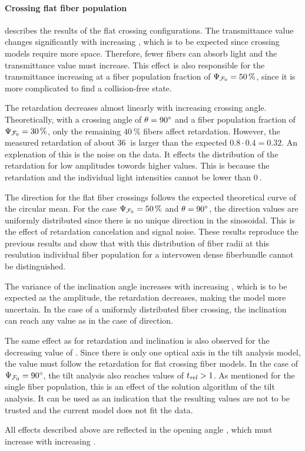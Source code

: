 \paragraph{Crossing flat fiber population}
 describes the results of the flat crossing configurations.
The transmittance value changes significantly with increasing \modelOmega{}, which is to be expected since crossing models require more space.
Therefore, fewer fibers can absorb light and the transmittance value must increase.
This effect is also responsible for the transmittance increasing at a fiber population fraction of $\textnormal{$\Psi_{\textnormal{$\mathcal{F}_0$}}$}=\SI{50}{\percent}$, since it is more complicated to find a collision-free state.
\par
%
The retardation decreases almost linearly with increasing crossing angle.
Theoretically, with a crossing angle of $\textnormal{$\theta$}=\SI{90}{\degree}$ and a fiber population fraction of $\textnormal{$\Psi_{\textnormal{$\mathcal{F}_0$}}$}=\SI{30}{\percent}$, only the remaining $\SI{40}{\percent}$ fibers affect retardation.
However, the measured retardation of about $\SI{36}{}$ is larger than the expected $0.8\cdot 0.4 = 0.32$.
An explenation of this is the noise on the data.
It effects the distribution of the retardation for low amplitudes towords higher values.
This is because the retardation and the individual light intensities cannot be lower than $\SI{0}{}$.
\par
%
The direction for the flat fiber crossings follows the expected theoretical curve of the circular mean.
For the case $\textnormal{$\Psi_{\textnormal{$\mathcal{F}_0$}}$}=\SI{50}{\percent}$ and $\textnormal{$\theta$}=\SI{90}{\degree}$, the direction values are uniformly distributed since there is no unique direction in the sinosoidal.
This is the effect of retardation cancelation and signal noise.
These results reproduce the previous results  and show that with this distribution of fiber radii at this resulution individual fiber population for a intervowen dense fiberbundle cannot be distinguished.
\par
%
The variance of the inclination angle increases with increasing \modelOmega{}, which is to be expected as the amplitude, \ie{} the retardation decreases, making the model more uncertain.
In the case of a uniformly distributed fiber crossing, the inclination can reach any value as in the case of direction.
\par
%
The same effect as for retardation and inclination is also observed for the decreasing value of \trel{}.
Since there is only one optical axis in the tilt analysis model, the \trel{} value must follow the retardation for flat crossing fiber models.
In the case of $\textnormal{$\Psi_{\textnormal{$\mathcal{F}_0$}}$}=\SI{90}{\degree}$, the tilt analysis also reaches values of $\textnormal{$t_\mathit{rel}$}>1$.
As mentioned for the single fiber population, this is an effect of the solution algorithm of the tilt analysis.
It can be used as an indication that the resulting values are not to be trusted and the current model does not fit the data.
\par
%
All effects described above are reflected in the opening angle \openingAngle{}, which must increase with increasing \modelOmega{} .
%
% 
%
%
